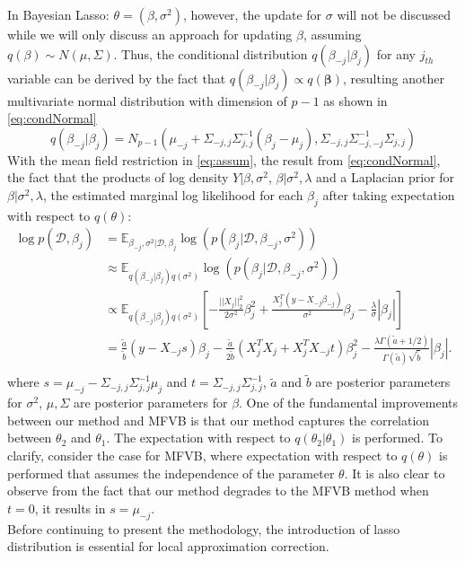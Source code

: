 In Bayesian Lasso: $\theta = (\beta,\sigma^2)$, however, the update for $\sigma$ will not be discussed while we will only discuss an approach for updating $\beta$, assuming $q(\beta) \sim N(\mu,\Sigma)$. Thus,
the conditional distribution $q(\beta_{-j}|\beta_{j})$ for any $j_{th}$ variable can be derived by the fact that $q(\beta_{-j}|\beta_{j}) \propto q(\mathbf{\beta})$, resulting another multivariate normal distribution with dimension of $p-1$ as shown in \autoref{eq:condNormal}
\begin{equation}
	\label{eq:condNormal}
	q(\beta_{-j}|\beta_{j}) = N_{p-1}(\mu_{-j}+\Sigma_{-j,j}\Sigma_{j,j}^{-1}(\beta_j-\mu_j), \Sigma_{-j,j} \Sigma_{-j,-j}^{-1}\Sigma_{j,j})
\end{equation}
With the mean field restriction in \autoref{eq:assum}, the result from \autoref{eq:condNormal}, the fact that the products of log density $Y|\beta,\sigma^2$, $\beta|\sigma^2,\lambda$ and a Laplacian prior for $\beta|\sigma^2,\lambda$, the estimated marginal log likelihood for each $\beta_j$ after taking expectation with respect to $q(\theta)$:
\begin{equation}
	\label{eq:MarLike}
	\begin{aligned}
		\log p(\mathcal{D},\beta_j) &= \mathbb{E}_{\beta_{-j},\sigma^2|\mathcal{D},\beta_j} 	\log(p(\beta_j|\mathcal{D},\beta_{-j},\sigma^2))\\
		& \approx \mathbb{E}_{q(\beta_{-j}|\beta_j)q(\sigma^2)}
		\log(p(\beta_j|\mathcal{D},\beta_{-j},\sigma^2))\\
		& \propto \mathbb{E}_{q(\beta_{-j}|\beta_j)q(\sigma^2)}[-\frac{||X_j||_2^2}{2\sigma^2}\beta_j^2 + \frac{X_j^T(y - X_{-j}\beta_{-j})}{\sigma^2}\beta_j - \frac{\lambda}{\sigma}|\beta_j|]\\
		&= \frac{\tilde{a}}{\tilde{b}}(y - X_{-j}s)\beta_j - \frac{\tilde{a}}{2\tilde{b}}(X_j^TX_j+X_j^TX_{-j}t)\beta_j^2 - \frac{\lambda \Gamma(\tilde{a}+1/2)}{\Gamma(\tilde{a})\sqrt{\tilde{b}}}|\beta_j|.\\
	\end{aligned}
\end{equation}
where $s = \mu_{-j} - \Sigma_{-j,j}\Sigma_{j,j}^{-1}\mu_j$ and $t = \Sigma_{-j,j}\Sigma_{j,j}^{-1}$, $\tilde{a}$ and $\tilde{b}$ are posterior parameters for $\sigma^2$, $\mu,\Sigma$ are posterior parameters for $\beta$.
One of the fundamental improvements between our method and MFVB is that our method captures the correlation between $\theta_2$ and $\theta_1$. The expectation with respect to $q(\theta_2|\theta_1)$ is performed. To clarify, consider the case for MFVB, where expectation with respect to $q(\theta)$ is performed that assumes the independence of the parameter $\theta$.
It is also clear to observe from the fact that our method degrades to the MFVB method when $t = 0$, it results in $s = \mu_{-j}$.\\
Before continuing to present the methodology, the introduction of lasso distribution is essential for local approximation correction.




